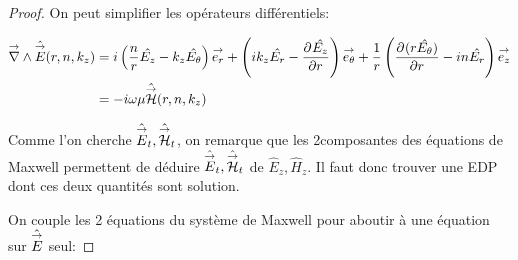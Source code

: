   \begin{proof}

    On peut simplifier les opérateurs différentiels:

    \begin{align}
      \vrot \hat \vE(r,n,k_z) &= i\left(\frac{n}{r}\hat{E_z} - k_z\hat{E_\theta}\right)\vect{e_r} +
      \left(ik_z\hat{E_r} - \ddr{r}{\hat{E_z}}\right)\vect{e_\theta} +
      \frac{1}{r}\left(\ddr{r}{(r\hat{E_\theta})}-in\hat{E_r}\right)\vect{e_z}
      \\
      &=-i\w\mu \hat \vH(r,n,k_z)
    \end{align}


    Comme l'on cherche \(\hat \vE_t, \hat \vH_t\), on remarque que les 2\ieme composantes des équations de Maxwell permettent de déduire \(\hat\vE_t, \hat\vH_t\) de \( \hat E_z, \hat H_z\). Il faut donc trouver une EDP dont ces deux quantités sont solution.

    On couple les 2 équations du système de Maxwell pour aboutir à une équation sur \(\hat \vE\) seul:




\end{proof}
